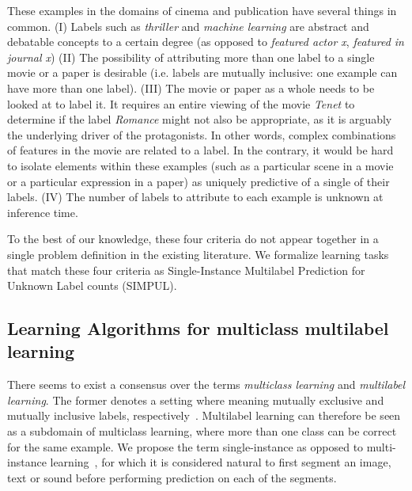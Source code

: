 
These examples in the domains of cinema and publication have several things in common. (I) Labels
such as \textit{thriller} and \textit{machine learning} are abstract and
debatable concepts to a certain degree (as opposed to \textit{featured actor
x}, \textit{featured in journal x}) (II) The possibility of attributing more
than one label to a single movie or a paper is desirable (i.e. labels are
mutually inclusive: one example can have more than one label). (III) The movie
or paper as a whole needs to be looked at to label it. It requires an entire
viewing of the movie \textit{Tenet} to determine if the label \textit{Romance}
might not also be appropriate, as it is arguably the underlying driver of the
protagonists. In other words, complex combinations of features in the movie
are related to a label. In the contrary, it would be hard to isolate elements
within these examples (such as a particular scene in a movie or a particular
expression in a paper) as uniquely predictive of a single of their labels.
(IV) The number of labels to attribute to each example is unknown at inference
time.

To the best of our knowledge, these four criteria do not appear together in a
single problem definition in the existing literature. We formalize learning
tasks that match these four criteria as Single-Instance Multilabel Prediction
for Unknown Label counts (SIMPUL).

\subsection{Learning Algorithms for multiclass multilabel learning}
There seems to exist a consensus over the terms \emph{multiclass learning} and
\emph{multilabel learning}. The former denotes a setting where  meaning mutually exclusive and mutually inclusive
labels, respectively~\cite{multilabelMethods}. Multilabel learning can
therefore be seen as a subdomain of multiclass learning, where more than one
class can be correct for the same example. We propose the term single-instance
as opposed to multi-instance learning~\citep[e.g.,][]{multiInstance,
multiInstanceMultiLabel}, for which it is considered natural to first segment
an image, text or sound before performing prediction on each of the segments.

